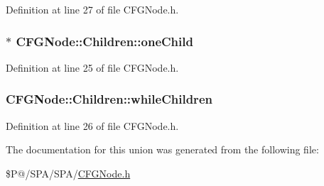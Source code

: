 Definition at line 27 of file C\-F\-G\-Node.\-h.

\hypertarget{union_c_f_g_node_1_1_children_afc60bae44a853ec41443f1c923860959}{
\subsubsection[{one\-Child}]{$\ast$ C\-F\-G\-Node\-::\-Children\-::one\-Child}}\label{union_c_f_g_node_1_1_children_afc60bae44a853ec41443f1c923860959}


Definition at line 25 of file C\-F\-G\-Node.\-h.

\hypertarget{union_c_f_g_node_1_1_children_a2047e28982d12e37280e67961a3e3522}{
\subsubsection[{while\-Children}]{ C\-F\-G\-Node\-::\-Children\-::while\-Children}}\label{union_c_f_g_node_1_1_children_a2047e28982d12e37280e67961a3e3522}


Definition at line 26 of file C\-F\-G\-Node.\-h.



The documentation for this union was generated from the following file\-:\begin{DoxyCompactItemize}
\item 
\$\-P@/\-S\-P\-A/\-S\-P\-A/\hyperlink{_c_f_g_node_8h}{C\-F\-G\-Node.\-h}\end{DoxyCompactItemize}
